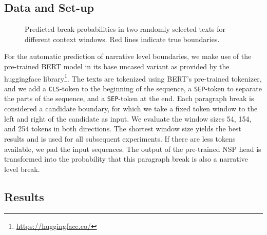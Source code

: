 \documentclass[10pt, a4paper]{article}
\begin{document}
\subsection{Data and Set-up}

\begin{figure}[th]
\caption{Predicted break probabilities in two randomly selected texts for different context windows. Red lines indicate true boundaries.}
\label{fig:probabilities}
\end{figure}


For the automatic prediction of narrative level boundaries, we make use of the pre-trained BERT model \cite{devlin-etal-2019-bert} in its base uncased variant as provided by the huggingface library\footnote{\url{https://huggingface.co/}}. 
The texts are tokenized using BERT's pre-trained tokenizer, and we add a \texttt{CLS}-token to the beginning of the sequence, a \texttt{SEP}-token to separate the parts of the sequence, and a \texttt{SEP}-token at the end. 
Each paragraph break is considered a candidate boundary, for which we take a fixed token window to the left and right of the candidate as input. We evaluate the window sizes 54, 154, and 254 tokens in both directions. The shortest window size yields the best results and is used for all subsequent experiments. If there are less tokens available, we pad the input sequences. The output of the pre-trained NSP head is transformed into the probability that this paragraph break is also a narrative level break.

\subsection{Results}
\end{document}
